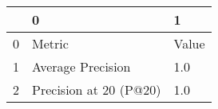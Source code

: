 \begin{tabular}{lll}
\toprule
{} &                       0 &      1 \\
\midrule
0 &                  Metric &  Value \\
1 &       Average Precision &    1.0 \\
2 &  Precision at 20 (P@20) &    1.0 \\
\bottomrule
\end{tabular}

